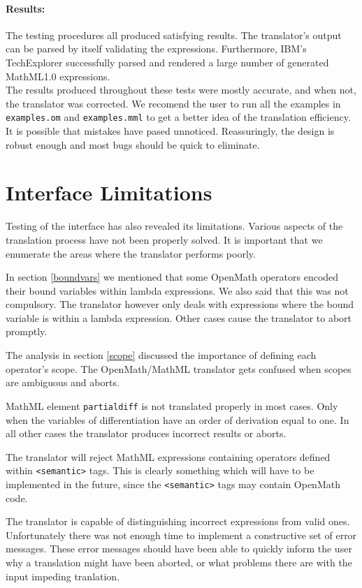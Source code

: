 \paragraph{Results:} The testing procedures all produced satisfying results. The translator's output can be parsed by itself validating the
expressions. Furthermore, IBM's TechExplorer successfully parsed and rendered a large number
of generated MathML1.0 expressions. \\

The results produced throughout these tests were mostly accurate, and when not, the translator was corrected. We recomend the user to run all the
examples in {\tt examples.om} and {\tt examples.mml} to get a better idea of the translation efficiency. It is possible that mistakes have pased
unnoticed. Reassuringly, the design is robust enough and most bugs should be quick to eliminate.

\section{Interface Limitations}

Testing of the interface has also revealed its limitations. Various
aspects of the translation process have not been properly solved. It is
important that we enumerate the areas where the translator performs
poorly.

In section \ref{boundvars} we mentioned that some OpenMath operators
encoded their bound variables within lambda expressions. We also said
that this was not compulsory. The translator however only deals with
expressions where the bound variable is within a lambda expression. Other
cases cause the translator to abort promptly.

The analysis in section \ref{scope} discussed the importance of defining
each operator's scope. The OpenMath/MathML translator gets confused when
scopes are ambiguous and aborts.

MathML element {\tt partialdiff} is not translated properly in most
cases. Only when the variables of differentiation have an order of
derivation equal to one. In all other cases the translator produces
incorrect results or aborts.

The translator will reject MathML expressions containing operators
defined within \verb|<semantic>| tags. This is clearly something which
will have to be implemented in the future, since the \verb|<semantic>|
tags may contain OpenMath code. 

The translator is capable of distinguishing incorrect expressions from valid ones. Unfortunately there was not enough time to implement a
constructive set of error messages. These error messages should have been able to quickly inform the user why a translation might have been
aborted, or what problems there are with the input impeding tranlation.


